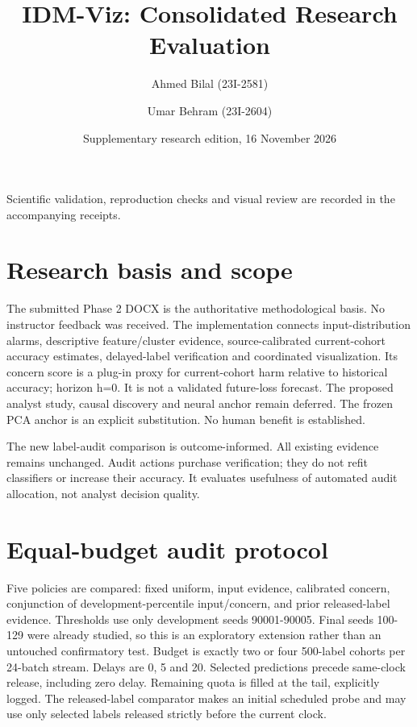 \documentclass[11pt,a4paper]{article}
\title{IDM-Viz: Consolidated Research Evaluation}
\author{Ahmed Bilal (23I-2581) \and Umar Behram (23I-2604)}
\date{Supplementary research edition, 16 November 2026}
\begin{document}
\maketitle
\noindent Scientific validation, reproduction checks and visual review are recorded in the accompanying receipts.\par

\section{Research basis and scope}

The submitted Phase 2 DOCX is the authoritative methodological basis. No instructor feedback was received. The implementation connects input-distribution alarms, descriptive feature/cluster evidence, source-calibrated current-cohort accuracy estimates, delayed-label verification and coordinated visualization. Its concern score is a plug-in proxy for current-cohort harm relative to historical accuracy; horizon h=0. It is not a validated future-loss forecast. The proposed analyst study, causal discovery and neural anchor remain deferred. The frozen PCA anchor is an explicit substitution. No human benefit is established.\par

The new label-audit comparison is outcome-informed. All existing evidence remains unchanged. Audit actions purchase verification; they do not refit classifiers or increase their accuracy. It evaluates usefulness of automated audit allocation, not analyst decision quality.\par

\section{Equal-budget audit protocol}

Five policies are compared: fixed uniform, input evidence, calibrated concern, conjunction of development-percentile input/concern, and prior released-label evidence. Thresholds use only development seeds 90001-90005. Final seeds 100-129 were already studied, so this is an exploratory extension rather than an untouched confirmatory test. Budget is exactly two or four 500-label cohorts per 24-batch stream. Delays are 0, 5 and 20. Selected predictions precede same-clock release, including zero delay. Remaining quota is filled at the tail, explicitly logged. The released-label comparator makes an initial scheduled probe and may use only selected labels released strictly before the current clock.\par
\end{document}
